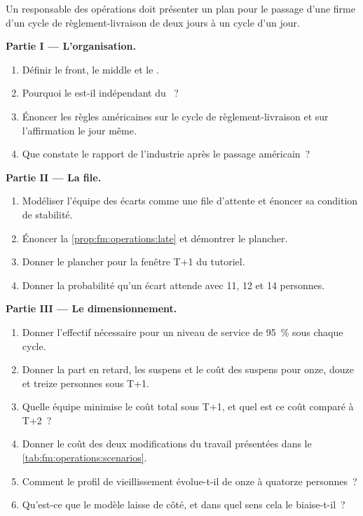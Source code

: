 \begin{problem}\label{pb:fm:operations:1}
Un responsable des opérations doit présenter un plan pour le passage d'une firme d'un cycle de règlement-livraison de deux jours à un cycle d'un jour.

\medskip\noindent\textbf{Partie I --- L'organisation.}
\begin{enumerate}
\item Définir le front, le middle et le .
\item Pourquoi le  est-il indépendant du ~?
\item Énoncer les règles américaines sur le cycle de règlement-livraison et sur l'affirmation le jour même.
\item Que constate le rapport de l'industrie après le passage américain~?
\end{enumerate}

\medskip\noindent\textbf{Partie II --- La file.}
\begin{enumerate}[resume]
\item Modéliser l'équipe des écarts comme une file d'attente et énoncer sa condition de stabilité.
\item Énoncer la \cref{prop:fm:operations:late} et démontrer le plancher.
\item Donner le plancher pour la fenêtre T+1 du tutoriel.
\item Donner la probabilité qu'un écart attende avec 11, 12 et 14 personnes.
\end{enumerate}

\medskip\noindent\textbf{Partie III --- Le dimensionnement.}
\begin{enumerate}[resume]
\item Donner l'effectif nécessaire pour un niveau de service de 95~\% sous chaque cycle.
\item Donner la part en retard, les suspens et le coût des suspens pour onze, douze et treize personnes sous T+1.
\item Quelle équipe minimise le coût total sous T+1, et quel est ce coût comparé à T+2~?
\item Donner le coût des deux modifications du travail présentées dans le \cref{tab:fm:operations:scenarios}.
\item Comment le profil de vieillissement évolue-t-il de onze à quatorze personnes~?
\item Qu'est-ce que le modèle laisse de côté, et dans quel sens cela le biaise-t-il~?
\end{enumerate}


\end{problem}

